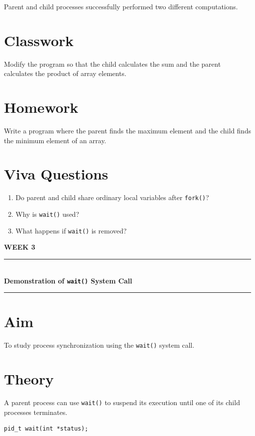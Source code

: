 \documentclass[12pt,a4paper]{report}
\newcommand{\experimenttitle}[2]{
\clearpage
\begin{center}
{\Large\bfseries\color{univblue} WEEK #1}\\[0.15cm]
\rule{\textwidth}{1pt}\\[0.2cm]
{\LARGE\bfseries #2}\\[0.2cm]
\rule{\textwidth}{1pt}
\end{center}
\vspace{0.4cm}
}
\begin{document}
Parent and child processes successfully performed two different computations.

\section*{Classwork}

Modify the program so that the child calculates the sum and the parent
calculates the product of array elements.

\section*{Homework}

Write a program where the parent finds the maximum element and the child finds
the minimum element of an array.

\section*{Viva Questions}

\begin{enumerate}
    \item Do parent and child share ordinary local variables after
    \texttt{fork()}?
    \item Why is \texttt{wait()} used?
    \item What happens if \texttt{wait()} is removed?
\end{enumerate}


\experimenttitle{3}{Demonstration of \texttt{wait()} System Call}

\section*{Aim}

To study process synchronization using the \texttt{wait()} system call.

\section*{Theory}

A parent process can use \texttt{wait()} to suspend its execution until one of
its child processes terminates.

\begin{verbatim}
pid_t wait(int *status);
\end{verbatim}
\end{document}
